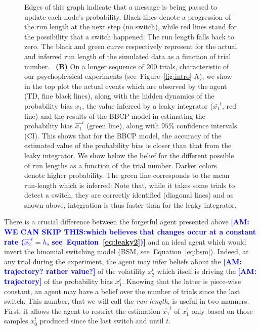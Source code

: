 \documentclass[12pt,english]{article}%
\newcommand{\seeFig}[1]{Figure~\ref{fig:#1}}
\newcommand{\seeEq}[1]{Equation~\ref{eq:#1}}
\newcommand{\AM}[1]{\textbf{\textcolor{blue}{[AM: #1]}}}
\begin{document}
\begin{figure}
{Edges of this graph indicate that a message is being passed
to update each node's probability.
Black lines denote a progression of the run length at the next step (no switch),
while red lines stand for the possibility that a switch happened:
The run length falls back to zero.
The black and green curve respectively represent for
the actual and inferred run length of the simulated data
as a function of trial number.
~\textbf{(B)} On a longer sequence of $200$ trials,
characteristic of our psychophysical experiments (see~\seeFig{intro}-A), %
we show in the top plot
the actual events which are observed by the agent (TD, fine black lines),
along with the hidden dynamics of the probability bias $x_1$,
the value inferred by a leaky integrator ($\bar{x_1}^t$, red line)
and the results of the BBCP model 
in estimating the probability bias $\hat{x_1}^t$ (green line),
along with $95\%$ confidence intervals (CI).
This shows that for the BBCP model,
the accuracy of the estimated value of the probability bias
is closer than that from the leaky integrator.
We show below the belief for the different possible of run lengths
as a function of the trial number. 
Darker colors denote higher probability. 
The green line corresponds to the mean run-length which is inferred:
Note that, while it takes some trials to detect a switch,
they are correctly identified (diagonal lines) and
as shown above, integration is thus faster than for the leaky integrator.
}
\label{fig:bayesianchangepoint}
\end{figure}
There is a crucial difference between the forgetful agent presented above
\AM{WE CAN SKIP THIS:which believes that changes occur at a constant rate ($\hat{x_2}^t=h$, see~\seeEq{leaky2})}
and an ideal agent which would invert the binomial switching model (BSM, see~\seeEq{bsm}).
Indeed, at any trial during the experiment,
the agent may infer beliefs about the \AM{trajectory? rather value?} of the volatility $x_2^t$
which itself is driving the \AM{trajectory} of the probability bias $x_1^t$.
Knowing that the latter is piece-wise constant,
an agent may have a belief over the number of trials since the last switch.
This number, that we will call the \emph{run-length}, is useful in two manners.
First, it allows the agent to restrict the estimation $\hat{x_1}^{t}$ of $x_1^t$
only based on those samples $x_0^t$ produced since the last switch and until $t$.
\end{document}
